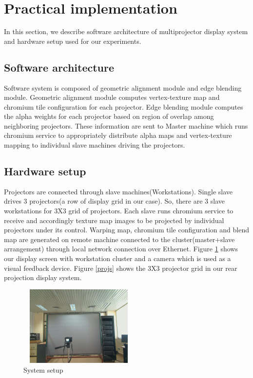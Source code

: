 \documentclass[conference]{/home/pranav/Desktop/Publication_work/latex_class_files/IEEEtran}
\begin{document}
\section{Practical implementation}
In this section, we describe software architecture of multiprojector display system and hardware setup used for our experiments.

\subsection{Software architecture}
Software system is composed of geometric alignment module and edge blending module. Geometric alignment module computes vertex-texture map and chromium tile configuration for each projector. Edge blending module computes the alpha weights for each projector based on region of overlap among neighboring projectors. These information are sent to Master machine which runs chromium service to appropriately distribute alpha maps and vertex-texture mapping to individual slave machines driving the projectors.

\subsection{Hardware setup}
Projectors are connected through slave machines(Workstations). Single slave drives 3 projectors(a row of display grid in our case). So, there are 3 slave workstations for 3X3 grid of projectors. Each slave runs chromium service to receive and accordingly texture map images to be projected by individual projectors under its control. Warping map, chromium tile configuration and blend map are generated on remote machine connected to the cluster(master+slave arrangement) through local network connection over Ethernet. Figure \ref{setup} shows our display screen with workstation cluster and a camera which is used as a visual feedback device. Figure \ref{projs} shows the 3X3 projector grid in our rear projection display system.
\begin{figure}
\centering
\includegraphics[width=6cm,height=4cm]{figures/setup.jpg}
\caption{System setup}
\label{setup}
\end{figure}
\end{document}
